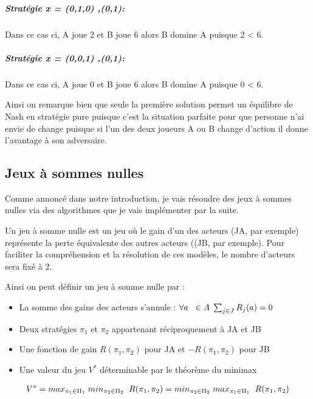 \documentclass[a4paper, 12pt, twoside]{article}
\begin{document}
{{\subparagraph*{Stratégie x = {(0,1,0) ,(0,1)}:} {Dans ce cas ci, A joue 2 et B joue 6 alors B domine A puisque 2 < 6.}

\subparagraph*{Stratégie x = {(0,0,1) ,(0,1)}:} {Dans ce cas ci, A joue 0 et B joue 6 alors B domine A puisque 0 < 6.} \newline

Ainsi on remarque bien que seule la première solution permet un équilibre de Nash en stratégie pure puisque c'est la situation parfaite pour que personne n'ai envie de change puisque si l'un des deux joueurs A ou B change d'action il donne l'avantage à son adversaire.
\subsection{Jeux à sommes nulles}
Comme annoncé dans notre introduction, je vais résoudre des jeux à sommes nulles via des algorithmes que je vais implémenter par la suite. \newline

Un jeu à somme nulle est un jeu où le gain d'un des acteurs (JA, par exemple) représente la perte équivalente des autres acteurs ((JB, par exemple). Pour faciliter la compréhension et la résolution de ces modèles, le nombre d'acteurs sera fixé à 2.\newline

Ainsi on peut définir un jeu à somme nulle par : 
\begin{itemize}
\item La somme des gains des acteurs s'annule : $\forall a \hspace{0,2 cm} \in A\hspace{0,09 cm} \sum_{j\in J} R_{j}(a) = 0$
\item Deux stratégies $\pi_{1}$ et $\pi_{2}$ appartenant réciproquement à \textsf{\textsf{JA}} et \textsf{\textsf{JB}}
\item Une fonction de gain $R(\pi_{1},\pi_{2})$ pour \textsf{JA} et $-R(\pi_{1},\pi_{2})$ pour \textsf{JB}
\item Une valeur du jeu $V^{*}$ déterminable par le théorème du \textsf{minimax}
\end{itemize}

\begin{align*}
V^{*} = max_{\pi_{1} \in \Pi_{1}}\hspace{0,1cm} min_{\pi_{2} \in \Pi_{2}} \hspace{0,2 cm} R(\pi_{1},\pi_{2}) = min_{\pi_{2} \in \Pi_{2}}\hspace{0,1cm} max_{\pi_{1} \in \Pi_{1}} \hspace{0,2 cm} R(\pi_{1},\pi_{2})
\end{align*}

}}
\end{document}
